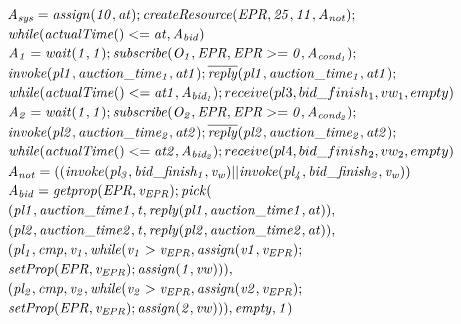 \noindent 
%
${\it A_{sys}=assign(10,at);
			createResource(EPR,25,11,A_{not});
			}$ \\\indent \hspace{0.6cm} ${\it
			while(actualTime()<=at,A_{bid})}$\\
%
${\it A_1=wait(1,1);
		subscribe(O_1,EPR,EPR>=0,A_{cond_{1}});
		}$ \\\indent \hspace{0.6cm} ${\it
		invoke(pl1,auction\_time_1,at1); 
		\overline{reply}(pl1,auction\_time_1,at1);
		}$ \\\indent \hspace{0.6cm} ${\it
		while(actualTime()<=at1,A_{bid_{1}})};
		receive(pl3,bid\_finish_1,vw_1,empty)$\\
%
${\it A_2=wait(1,1);
		subscribe(O_2,EPR,EPR>=0,A_{cond_{2}});
		}$ \\\indent \hspace{0.6cm} ${\it
		invoke(pl2,auction\_time_2,at2);\\ 
		\overline{reply}(pl2,auction\_time_2,at2);
		}$ \\\indent \hspace{0.6cm} ${\it
		while(actualTime()<=at2,A_{bid_{2}})};
		receive(pl4,bid\_finish_2,vw_2,empty)$\\ 
%
${\it A_{not}= %
		((invoke(pl_3,bid\_finish_1,v_w)||
		invoke(pl_4,bid\_finish_2,v_w))}$\\
%
${\it A_{bid}= getprop(EPR,v_{EPR}); 
		pick(
			}$ \\\indent \hspace{0.6cm} ${\it
			(pl1,auction\_time1,t,reply(pl1,auction\_time1,at)),
			}$ \\\indent \hspace{0.6cm} ${\it
			(pl2,auction\_time2,t,reply(pl2,auction\_time2,at)),
			}$ \\\indent \hspace{0.6cm} ${\it
			(pl_1,cmp,v_1,while(v_1>v_{EPR},assign(v1,v_{EPR});
			}$ \\\indent \indent \hspace{0.6cm} ${\it
			setProp(EPR,v_{EPR});assign(1,vw))),
			}$ \\\indent \hspace{0.6cm} ${\it
			(pl_2,cmp,v_2,while(v_2>v_{EPR},assign(v2,v_{EPR});
			}$ \\\indent \indent \hspace{0.6cm}${\it 
			setProp(EPR,v_{EPR});assign(2,vw))),empty,1)}$\\
